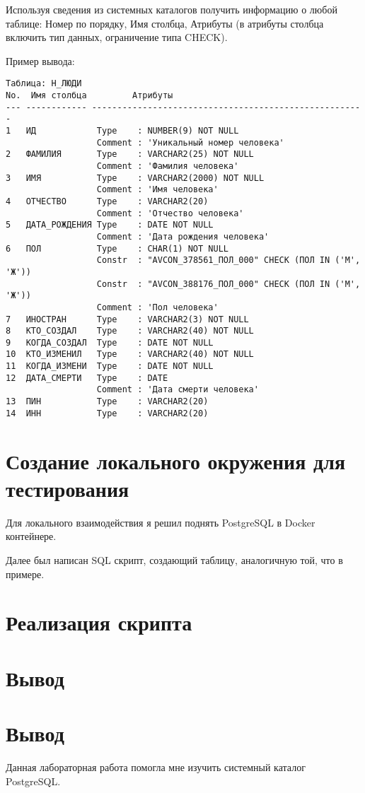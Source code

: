 \documentclass{article}
\begin{document}
Используя сведения из системных каталогов получить информацию о любой таблице: Номер по порядку, Имя столбца, Атрибуты (в атрибуты столбца включить тип данных, ограничение типа CHECK).

Пример вывода:
\begin{verbatim}
Таблица: Н_ЛЮДИ
No.  Имя столбца         Атрибуты
--- ------------ ------------------------------------------------------
1   ИД            Type    : NUMBER(9) NOT NULL
                  Comment : 'Уникальный номер человека'
2   ФАМИЛИЯ       Type    : VARCHAR2(25) NOT NULL
                  Comment : 'Фамилия человека'
3   ИМЯ           Type    : VARCHAR2(2000) NOT NULL
                  Comment : 'Имя человека'
4   ОТЧЕСТВО      Type    : VARCHAR2(20)  
                  Comment : 'Отчество человека'
5   ДАТА_РОЖДЕНИЯ Type    : DATE NOT NULL
                  Comment : 'Дата рождения человека'
6   ПОЛ           Type    : CHAR(1) NOT NULL
                  Constr  : "AVCON_378561_ПОЛ_000" CHECK (ПОЛ IN ('М', 'Ж'))
                  Constr  : "AVCON_388176_ПОЛ_000" CHECK (ПОЛ IN ('М', 'Ж'))
                  Comment : 'Пол человека'
7   ИНОСТРАН      Type    : VARCHAR2(3) NOT NULL
8   КТО_СОЗДАЛ    Type    : VARCHAR2(40) NOT NULL
9   КОГДА_СОЗДАЛ  Type    : DATE NOT NULL
10  КТО_ИЗМЕНИЛ   Type    : VARCHAR2(40) NOT NULL
11  КОГДА_ИЗМЕНИ  Type    : DATE NOT NULL
12  ДАТА_СМЕРТИ   Type    : DATE  
                  Comment : 'Дата смерти человека'
13  ПИН           Type    : VARCHAR2(20)  
14  ИНН           Type    : VARCHAR2(20)  
\end{verbatim}

\section{Создание локального окружения для тестирования}

Для локального взаимодействия я решил поднять PostgreSQL в Docker контейнере.



Далее был написан SQL скрипт, создающий таблицу, аналогичную той, что в примере.



\section{Реализация скрипта}



\section{Вывод}



\section{Вывод}

Данная лабораторная работа помогла мне изучить системный каталог PostgreSQL.

\begin{thebibliography}{9}

\end{thebibliography}
\end{document}
